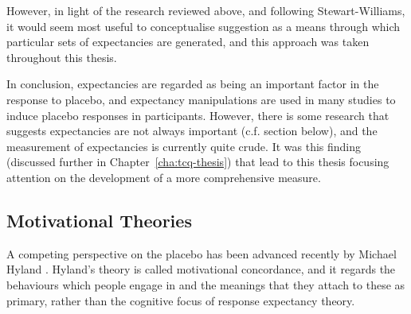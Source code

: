 
However, in light of the research reviewed above, and following Stewart-Williams, it would seem most useful to conceptualise suggestion as a means through which particular sets of expectancies are generated, and this approach was taken throughout this thesis. 

In conclusion, expectancies are regarded as being an important factor in the response to placebo, and expectancy manipulations are used in many studies to induce placebo responses in participants. However, there is some research that suggests expectancies are not always important \cite{Geers2005a} (c.f. section below), and the measurement of expectancies is currently quite crude. It was this finding (discussed further in Chapter~\ref{cha:tcq-thesis}) that lead to this thesis focusing attention on the development of a more comprehensive measure. 


\subsection{Motivational Theories}
\label{sec:behav-plac-motiv}

A competing perspective on the placebo has been advanced recently by Michael Hyland \cite{Hyland2006}. Hyland's theory is called motivational concordance, and it regards the behaviours which people engage in and the meanings that they attach to these as primary,  rather than the cognitive focus of response expectancy theory.  

